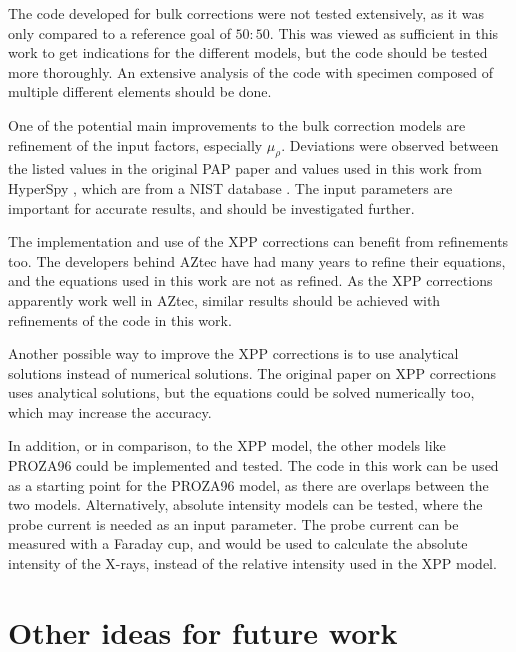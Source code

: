 The code developed for bulk corrections were not tested extensively, as it was only compared to a reference goal of $50:50$.
This was viewed as sufficient in this work to get indications for the different models, but the code should be tested more thoroughly.
An extensive analysis of the code with specimen composed of multiple different elements should be done.

One of the potential main improvements to the bulk correction models are refinement of the input factors, especially $\mu_\rho$.
Deviations were observed between the listed values in the original PAP paper \cite{pap_1991} and values used in this work from HyperSpy \cite{hyperspy_1.7.1}, which are from a NIST database \cite{nist_xraydatabase_hyperspy}.
The input parameters are important for accurate results, and should be investigated further.

The implementation and use of the XPP corrections can benefit from refinements too.
The developers behind AZtec have had many years to refine their equations, and the equations used in this work are not as refined.
As the XPP corrections apparently work well in AZtec, similar results should be achieved with refinements of the code in this work.

Another possible way to improve the XPP corrections is to use analytical solutions instead of numerical solutions.
The original paper on XPP corrections \cite{pap_1991} uses analytical solutions, but the equations could be solved numerically too, which may increase the accuracy.

In addition, or in comparison, to the XPP model, the other models like PROZA96 could be implemented and tested.
The code in this work can be used as a starting point for the PROZA96 model, as there are overlaps between the two models.
Alternatively, absolute intensity models can be tested, where the probe current is needed as an input parameter.
The probe current can be measured with a Faraday cup, and would be used to calculate the absolute intensity of the X-rays, instead of the relative intensity used in the XPP model.






\section{Other ideas for future work}
\label{sec:other_ideas_for_future_work}

